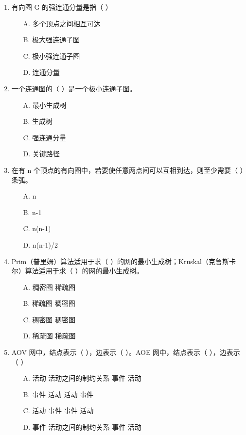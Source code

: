 \documentclass[12pt, a4paper]{article}
\begin{document}
\begin{enumerate}[label=\arabic*.]
	\item 有向图 G 的强连通分量是指（ ）
	      \begin{enumerate}
		      \item[A.] 多个顶点之间相互可达
		      \item[B.] 极大强连通子图
		      \item[C.] 极小强连通子图
		      \item[D.] 连通分量
	      \end{enumerate}

	\item 一个连通图的（ ）是一个极小连通子图。
	      \begin{enumerate}
		      \item[A.] 最小生成树
		      \item[B.] 生成树
		      \item[C.] 强连通分量
		      \item[D.] 关键路径
	      \end{enumerate}

	\item 在有 n 个顶点的有向图中，若要使任意两点间可以互相到达，则至少需要（ ）条弧。
	      \begin{enumerate}
		      \item[A.] n
		      \item[B.] n-1
		      \item[C.] n(n-1)
		      \item[D.] n(n-1)/2
	      \end{enumerate}

	\item Prim（普里姆）算法适用于求（ ）的网的最小生成树；Kruskal（克鲁斯卡尔）算法适用于求（ ）的网的最小生成树。
	      \begin{enumerate}
		      \item[A.] 稠密图 稀疏图
		      \item[B.] 稀疏图 稠密图
		      \item[C.] 稠密图 稠密图
		      \item[D.] 稀疏图 稀疏图
	      \end{enumerate}

	\item AOV 网中，结点表示（ ），边表示（ ）。AOE 网中，结点表示（ ），边表示（ ）
	      \begin{enumerate}
		      \item[A.] 活动 活动之间的制约关系 事件 活动
		      \item[B.] 事件 活动 活动 事件
		      \item[C.] 活动 事件 事件 活动
		      \item[D.] 事件 活动之间的制约关系 事件 活动
	      \end{enumerate}


\end{enumerate}
\end{document}
